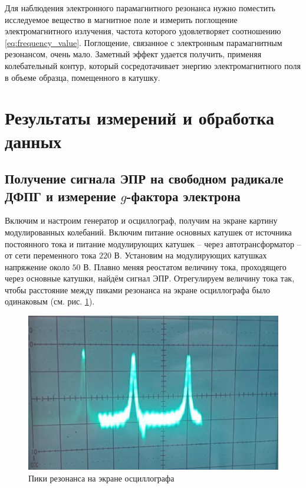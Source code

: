 \documentclass[a4paper, 12pt]{article}
\begin{document}
     Для наблюдения электронного парамагнитного резонанса нужно поместить исследуемое вещество в магнитное поле и измерить поглощение электромагнитного излучения, частота которого удовлетворяет соотношению \ref{eq:frequency_value}. Поглощение, связанное с электронным парамагнитным резонансом, очень мало. Заметный эффект удается получить, применяя колебательный контур, который сосредотачивает энергию электромагнитного поля в объеме образца, помещенного в катушку. 
    \newpage
	
    \section{Результаты измерений и обработка данных}

    \subsection{Получение сигнала ЭПР на свободном радикале ДФПГ и измерение $g$-фактора электрона}
    
    Включим и настроим генератор и осциллограф, получим на экране картину модулированных колебаний. Включим питание основных катушек от источника постоянного тока и питание модулирующих катушек -- через автотрансформатор -- от сети переменного тока $220$ В. Установим на модулирующих катушках напряжение около $50$ В. Плавно меняя реостатом величину тока, проходящего через основные катушки, найдём сигнал ЭПР. Отрегулируем величину тока так, чтобы расстояние между пиками резонанса на экране осциллографа было одинаковым (см. рис. \ref{img:peaks}).

    \begin{figure}[H]
    	\centering
    	\includegraphics[width = 14 cm]{images/peaks.png}
        \caption{Пики резонанса на экране осциллографа}
        \label{img:peaks}
    \end{figure}
\end{document}
